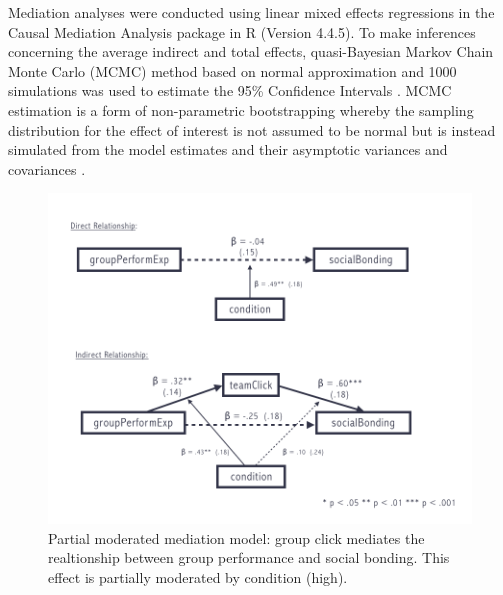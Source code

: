 



Mediation analyses were conducted using linear mixed effects regressions in the Causal Mediation Analysis package in R (Version 4.4.5).  To make inferences concerning the average indirect and total effects, quasi-Bayesian Markov Chain Monte Carlo (MCMC) method based on normal approximation and 1000 simulations was used to estimate the 95\% Confidence Intervals \citep{Tofighi2016a,Imai2010}. MCMC estimation is a form of non-parametric bootstrapping whereby the sampling distribution for the effect of interest is not assumed to be normal but is instead simulated from the model estimates and their asymptotic variances and covariances \cite{Preacher2008}.

\begin{figure}
  \centering
  \includegraphics[width=0.9\linewidth,keepaspectratio] {images/postExperimentModMedFigure}
  \caption{Partial moderated mediation model: group click mediates the realtionship between group performance and social bonding.  This effect is partially moderated by condition (high).}
  \label{fig:postExperimentModMedFigure}
\end{figure}



